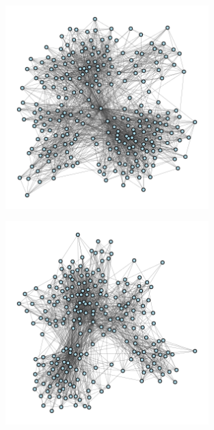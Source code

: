 \documentclass[12pt]{article}
\begin{document}
\begin{appendix}
\begin{figure}
\end{figure}
\begin{figure}
  \centering
  \caption{\protect}
  \includegraphics[width=0.7\textwidth]{../3_results/town_10.png} \\
\end{figure}
\begin{figure}
  \centering
  \caption{\protect}
  \includegraphics[width=0.7\textwidth]{../3_results/town_11.png} \\
\end{figure}
\begin{figure}
  \centering
  \caption{\protect}

\end{figure}
\end{appendix}
\end{document}
